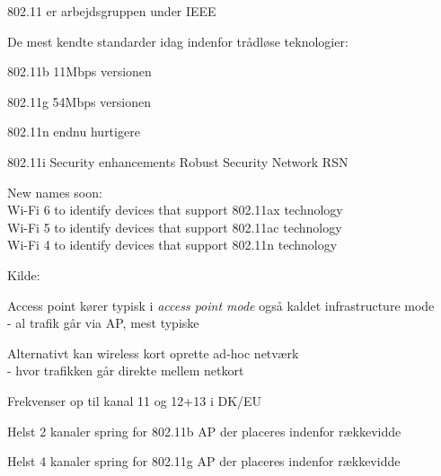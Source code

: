 \documentclass[Screen16to9,17pt]{foils}
\begin{document}
\begin{list1}
\item 802.11 er arbejdsgruppen under IEEE
\item De mest kendte standarder idag indenfor trådløse teknologier:
\begin{list2}
\item 802.11b 11Mbps versionen
\item 802.11g 54Mbps versionen
\item 802.11n endnu hurtigere
\item 802.11i Security enhancements Robust Security Network RSN
\end{list2}
\item New names soon:\\
Wi-Fi 6 to identify devices that support 802.11ax technology\\
Wi-Fi 5 to identify devices that support 802.11ac technology\\
Wi-Fi 4 to identify devices that support 802.11n technology
\end{list1}

Kilde: 


\begin{list1}
\item Access point kører typisk i \emph{access point mode} også kaldet
  infrastructure mode\\
  - al trafik går via AP, mest typiske
\item Alternativt kan wireless kort oprette ad-hoc netværk\\
 - hvor trafikken går direkte mellem netkort
\item Frekvenser op til kanal 11 og 12+13 i DK/EU
\item Helst 2 kanaler spring for 802.11b AP der placeres indenfor rækkevidde
\item Helst 4 kanaler spring for 802.11g AP der placeres indenfor rækkevidde
\end{list1}






\end{document}
